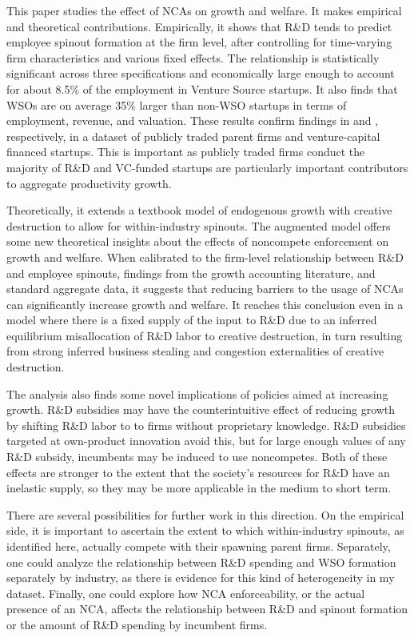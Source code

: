 \documentclass[11pt,english]{article}
\theoremstyle{definition}
\begin{document}
This paper studies the effect of NCAs on growth and welfare. It makes empirical and theoretical contributions. Empirically, it shows that R\&D tends to predict employee spinout formation at the firm level, after controlling for time-varying firm characteristics and various fixed effects. The relationship is statistically significant across three specifications and economically large enough to account for about 8.5\% of the employment in Venture Source startups. It also finds that WSOs are on average 35\% larger than non-WSO startups in terms of employment, revenue, and valuation. These results confirm findings in \cite{babina_entrepreneurial_2019} and \cite{muendler_employee_2012}, respectively, in a dataset of publicly traded parent firms and venture-capital financed startups. This is important as publicly traded firms conduct the majority of R\&D and VC-funded startups are particularly important contributors to aggregate productivity growth. 

Theoretically, it extends a textbook model of endogenous growth with creative destruction to allow for within-industry spinouts. The augmented model offers some new theoretical insights about the effects of noncompete enforcement on growth and welfare. When calibrated to the firm-level relationship between R\&D and employee spinouts, findings from the growth accounting literature, and standard aggregate data, it suggests that reducing barriers to the usage of NCAs can significantly increase growth and welfare. It reaches this conclusion even in a model where there is a fixed supply of the input to R\&D due to an inferred equilibrium misallocation of R\&D labor to creative destruction, in turn resulting from strong inferred business stealing and congestion externalities of creative destruction.

The analysis also finds some novel implications of policies aimed at increasing growth. R\&D subsidies may have the counterintuitive effect of reducing growth by shifting R\&D labor to to firms without proprietary knowledge. R\&D subsidies targeted at own-product innovation avoid this, but for large enough values of any R\&D subsidy, incumbents may be induced to use noncompetes. Both of these effects are stronger to the extent that the society's resources for R\&D have an inelastic supply, so they may be more applicable in the medium to short term.

There are several possibilities for further work in this direction. On the empirical side, it is important to ascertain the extent to which within-industry spinouts, as identified here, actually compete with their spawning parent firms. Separately, one could analyze the relationship between R\&D spending and WSO formation separately by industry, as there is evidence for this kind of heterogeneity in my dataset. Finally, one could explore how NCA enforceability, or the actual presence of an NCA, affects the relationship between R\&D and spinout formation or the amount of R\&D spending by incumbent firms.
\end{document}
